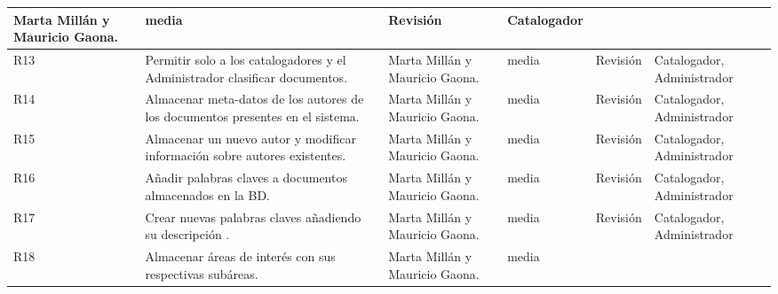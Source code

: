 \begin{center}
\begin{longtable}{|p{0.5cm}|p{3cm}|p{2cm}|p{0.8cm}|p{1.5cm}|p{2cm}|}
Marta Millán y Mauricio Gaona.
&	

media
&	

Revisión
&	

Catalogador\\
\hline

R13
&	

Permitir solo a los catalogadores y el Administrador clasificar documentos.
&	

Marta Millán y Mauricio Gaona.
&	

media
&	

Revisión
&	

Catalogador, Administrador\\
\hline
R14	
&
Almacenar meta-datos de los autores de los documentos presentes en el sistema.
&	

Marta Millán y Mauricio Gaona.
&	

media
&	

Revisión
&	

Catalogador, Administrador\\

\hline
R15
&	

Almacenar un nuevo autor y modificar información sobre autores existentes.
&	

Marta Millán y Mauricio Gaona.
&	

media
&	

Revisión
&	

Catalogador, Administrador\\
\hline
R16
&	

Añadir palabras claves a documentos almacenados en la BD.
&	

Marta Millán y Mauricio Gaona.
&	

media
&	

Revisión
&	

Catalogador, Administrador\\
\hline
R17
&	

Crear nuevas palabras claves añadiendo su descripción .
&	

Marta Millán y Mauricio Gaona.
&	

media
&	

Revisión
&	

Catalogador, Administrador\\
\hline
R18
&	

Almacenar áreas de interés con sus respectivas subáreas.
&	

Marta Millán y Mauricio Gaona.
&	

media
&	


\end{longtable}
\end{center}
